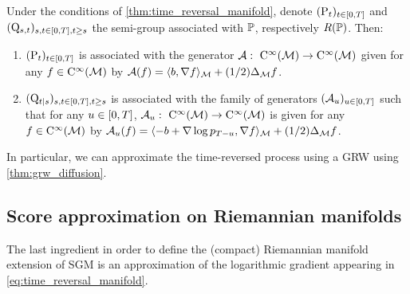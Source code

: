 \begin{corollary}
  Under the conditions of \cref{thm:time_reversal_manifold}, denote
  $(\mathrm{P}_t)_{t \in \left[0,T\right]}$ and
  $(\mathrm{Q}_{s,t})_{s, t \in \left[0,T\right], t\geq s}$ the semi-group associated with
  $\mathbb{P}$, respectively $R(\mathbb{P})$. Then:
  \begin{enumerate}[label= (\alph*),  wide, labelwidth=!, labelindent=0pt]
  \item $(\mathrm{P}_t)_{t \in \left[0,T\right]}$ is associated with the generator
          $\mathcal{A}: \ \mathrm{C}^\infty(\mathcal M) \to \mathrm{C}^\infty(\mathcal M)$ given for any
      $f \in \mathrm{C}^\infty(\mathcal M)$ by
      $\mathcal{A}(f) = \langle b, \nabla f \rangle_{\mathcal M} + (1/2) \Delta_\mathcal M f$.
  \item $(\mathrm{Q}_{t|s})_{s,t \in \left[0,T\right], t\geq s}$ is associated with the family of  generators $(\mathcal{A}_u)_{u \in \left[0,T\right]}$ such that for any $u \in \left[0,T\right]$, 
          $\mathcal{A}_u: \ \mathrm{C}^\infty(\mathcal M) \to \mathrm{C}^\infty(\mathcal M)$ is given for any
      $f \in \mathrm{C}^\infty(\mathcal M)$ by
      $\mathcal{A}_u(f) = \langle -b + \nabla \log p_{T-u}, \nabla f \rangle_{\mathcal M} + (1/2) \Delta_\mathcal M f$.
  \end{enumerate}
\end{corollary}

In particular, we can approximate the time-reversed process using a GRW using
\cref{thm:grw_diffusion}.

\subsection{Score approximation on Riemannian manifolds}
\label{sec:riem-score-appr}

The last ingredient in order to define the (compact) Riemannian manifold
extension of SGM is an approximation of the logarithmic gradient appearing in
\cref{eq:time_reversal_manifold}.


